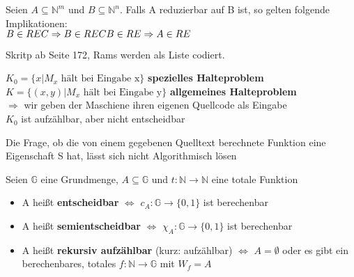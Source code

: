 \documentclass[14pt]{article}
\begin{document}
\begin{eigenschaft}
    Seien $A \subseteq \mathbb{N}^m$ und $B \subseteq \mathbb{N}^n$. Falls
    A reduzierbar auf B ist, so gelten folgende Implikationen:
    \\
    $
        B \in REC \Rightarrow B \in REC \\
        B \in RE \Rightarrow A \in RE
    $
\end{eigenschaft}
\begin{definition}[Gödelisierung]
    Skritp ab Seite 172, Rams werden als Liste codiert.
\end{definition}
\begin{definition}[Halteproblem]
    $K_0 = \{ x | M_x \text{ hält bei Eingabe x}\}$
    \textbf{spezielles Halteproblem} \\
    $K = \{ (x, y) | M_x \text{ hält bei Eingabe y}\}$
    \textbf{allgemeines Halteproblem} \\
    $\Rightarrow$ wir geben der Maschiene ihren eigenen Quellcode
    als Eingabe \\
    $K_0$ ist aufzählbar, aber nicht entscheidbar
\end{definition}
\begin{definition}
    Die Frage, ob die von einem gegebenen Quelltext berechnete Funktion
    eine Eigenschaft S hat, lässt sich nicht Algorithmisch lösen
\end{definition}
\begin{definition}
    Seien $\mathbb{G}$ eine Grundmenge, $A \subseteq \mathbb{G}$
    und $t: \mathbb{N} \rightarrow \mathbb{N}$ eine totale Funktion
    \begin{itemize}
        \item A heißt \textbf{entscheidbar} $\Leftrightarrow$ $c_A :
                  \mathbb{G} \rightarrow \{ 0, 1\}$ ist berechenbar
        \item A heißt \textbf{semientscheidbar} $\Leftrightarrow$ $\chi_A :
                  \mathbb{G} \rightarrow \{ 0, 1\}$ ist berechenbar
        \item A heißt \textbf{rekursiv aufzählbar} (kurz: aufzählbar)
              $\Leftrightarrow$ $A = \emptyset$ oder es gibt ein berechenbares,
              totales $f: \mathbb{N} \rightarrow \mathbb{G}$ mit $W_f = A$
    \end{itemize}
\end{definition}
\end{document}
